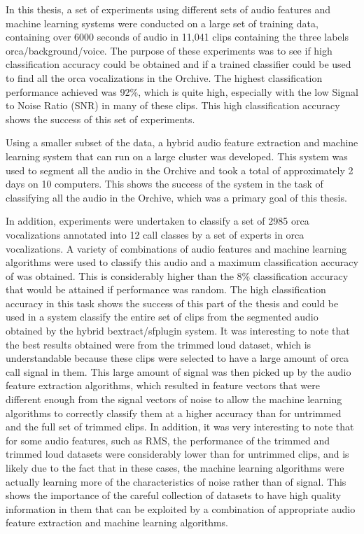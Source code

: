 \documentclass[12pt,oneside]{book}
\begin{document}
In this thesis, a set of experiments using different sets of audio
features and machine learning systems were conducted on a large set of
training data, containing over 6000 seconds of audio in 11,041 clips
containing the three labels orca/background/voice.  The purpose of
these experiments was to see if high classification accuracy could be
obtained and if a trained classifier could be used to find all the
orca vocalizations in the Orchive.  The highest classification
performance achieved was 92\%, which is quite high, especially with
the low Signal to Noise Ratio (SNR) in many of these clips.  This high
classification accuracy shows the success of this set of experiments.

Using a smaller subset of the data, a hybrid audio feature extraction
and machine learning system that can run on a large cluster was
developed.  This system was used to segment all the audio in the
Orchive and took a total of approximately 2 days on 10 computers.
This shows the success of the system in the task of classifying all
the audio in the Orchive, which was a primary goal of this thesis.

In addition, experiments were undertaken to classify a set of 2985
orca vocalizations annotated into 12 call classes by a set of experts
in orca vocalizations.  A variety of combinations of audio features
and machine learning algorithms were used to classify this audio and a
maximum classification accuracy of \classificationAccuracyOBV was
obtained.  This is considerably higher than the 8\% classification
accuracy that would be attained if performance was random.  The high
classification accuracy in this task shows the success of this part of
the thesis and could be used in a system classify the entire set of
clips from the segmented audio obtained by the hybrid
bextract/sfplugin system.  It was interesting to note that the best
results obtained were from the trimmed loud dataset, which is
understandable because these clips were selected to have a large
amount of orca call signal in them.  This large amount of signal was
then picked up by the audio feature extraction algorithms, which
resulted in feature vectors that were different enough from the signal
vectors of noise to allow the machine learning algorithms to correctly
classify them at a higher accuracy than for untrimmed and the full set
of trimmed clips.  In addition, it was very interesting to note that
for some audio features, such as RMS, the performance of the trimmed
and trimmed loud datasets were considerably lower than for untrimmed
clips, and is likely due to the fact that in these cases, the machine
learning algorithms were actually learning more of the characteristics
of noise rather than of signal.  This shows the importance of the
careful collection of datasets to have high quality information in
them that can be exploited by a combination of appropriate audio
feature extraction and machine learning algorithms.
\end{document}
